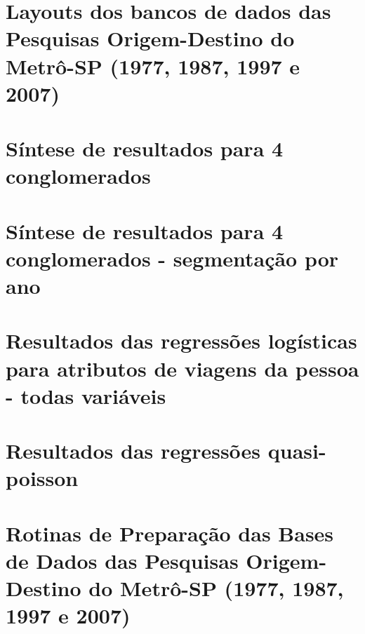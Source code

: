 \chapter{Layouts dos bancos de dados das Pesquisas Origem-Destino do Metrô-SP (1977, 1987, 1997 e 2007)}\label{chap:anexo_layouts}




\chapter{Síntese de resultados para 4 conglomerados}\label{chap:anexo_4_clusters_td}

\chapter{Síntese de resultados para 4 conglomerados - segmentação por ano}\label{chap:anexo_4_clusters_fam}


\chapter{Resultados das regressões logísticas para atributos de viagens da pessoa - todas variáveis}\label{chap:reg-log-pess}

\chapter{Resultados das regressões quasi-poisson}\label{chap:reg-poisson}



\chapter{Rotinas de Preparação das Bases de Dados das Pesquisas Origem-Destino do Metrô-SP (1977, 1987, 1997 e 2007)}\label{chap:anexo_rotinas}




